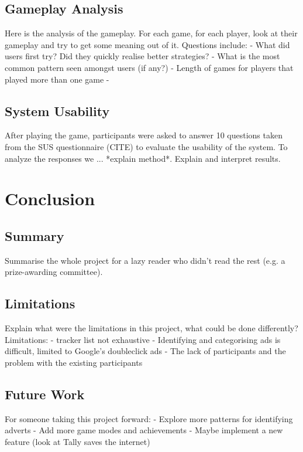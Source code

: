 \documentclass{l4proj}
\begin{document}
\section{Gameplay Analysis}
Here is the analysis of the gameplay. For each game, for each player, look at their gameplay and try to get some meaning out of it.
Questions include:
 - What did users first try? Did they quickly realise better strategies?
 - What is the most common pattern seen amongst users (if any?)
 - Length of games for players that played more than one game
 - 

\section{System Usability}
After playing the game, participants were asked to answer 10 questions taken from the SUS questionnaire (CITE) to evaluate the usability of the system. To analyze the responses we ... *explain method*. Explain and 
interpret results. 

\chapter{Conclusion}    

\section{Summary}
Summarise the whole project for a lazy reader who didn't read the rest (e.g. a prize-awarding committee).

\section{Limitations}
Explain what were the limitations in this project, what could be done differently? 
Limitations:
 - tracker list not exhaustive
 - Identifying and categorising ads is difficult, limited to Google's doubleclick ads
 - The lack of participants and the problem with the existing participants

\section{Future Work}
For someone taking this project forward:
 - Explore more patterns for identifying adverts
 - Add more game modes and achievements
 - Maybe implement a new feature (look at Tally saves the internet)
\end{document}
